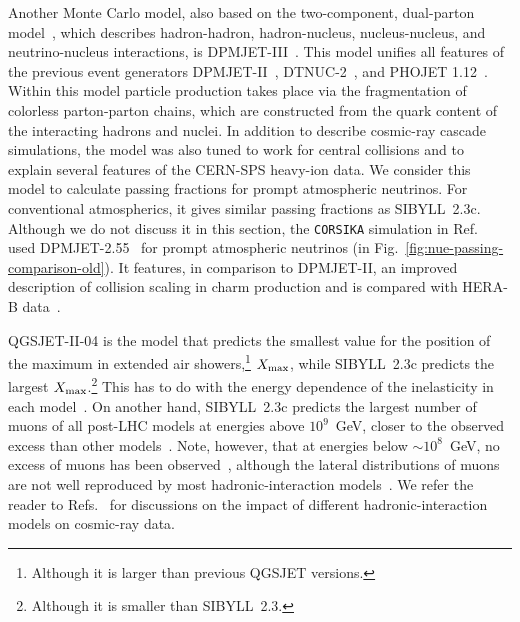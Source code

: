 \documentclass[aps,prd,showpacs,letterpaper,onecolumn,longbibliography,superscriptaddress,notitlepage,nofootinbib]{revtex4-1}%
\newcommand{\CORSIKA}{\texttt{CORSIKA}}
\begin{document}
Another Monte Carlo model, also based on the two-component, dual-parton model~\cite{Capella:1977me, Capella:1981xr, Capella:1992yb}, which describes hadron-hadron, hadron-nucleus, nucleus-nucleus, and neutrino-nucleus interactions, is DPMJET-III~\cite{Roesler:2000he}. This model unifies all features of the previous event generators DPMJET-II~\cite{Ranft:1994fd, Ranft:1999fy, Ranft:1999qe}, DTNUC-2~\cite{Engel:1996yb, Roesler:1998wy}, and PHOJET 1.12~\cite{Engel:1994vs, Engel:1995yda}. Within this model particle production takes place via the fragmentation of colorless parton-parton chains, which are constructed from the quark content of the interacting hadrons and nuclei. In addition to describe cosmic-ray cascade simulations, the model was also tuned to work for central collisions and to explain several features of the CERN-SPS heavy-ion data. We consider this model to calculate passing fractions for prompt atmospheric neutrinos. For conventional atmospherics, it gives similar passing fractions as SIBYLL~2.3c. Although we do not discuss it in this section, the \CORSIKA{} simulation in Ref.~\cite{Gaisser:2014bja} used DPMJET-2.55~\cite{Berghaus:2007hp} for prompt atmospheric neutrinos (in Fig.~\ref{fig:nue-passing-comparison-old}). It features, in comparison to DPMJET-II, an improved description of collision scaling in charm production and is compared with HERA-B data~\cite{Abt:2007zg}. 

QGSJET-II-04 is the model that predicts the smallest value for the position of the maximum in extended air showers,\footnote{Although it is larger than previous QGSJET versions.} $X_{\rm max}$, while SIBYLL~2.3c predicts the largest $X_{\rm max}$.\footnote{Although it is smaller than SIBYLL~2.3.} This has to do with the energy dependence of the inelasticity in each model~\cite{Ostapchenko:2016wtv}. On another hand, SIBYLL~2.3c predicts the largest number of muons of all post-LHC models at energies above $10^9$~GeV, closer to the observed excess than other models~\cite{Aab:2014pza, Apel:2017thr, Abbasi:2018fkz}. Note, however, that at energies below $\sim 10^8$~GeV, no excess of muons has been observed~\cite{Gonzalez:2016ntp, Fomin:2016kul}, although the lateral distributions of muons are not well reproduced by most hadronic-interaction models~\cite{Abbasi:2012kza}. We refer the reader to Refs.~\cite{Fedynitch:2012fs, Aab:2016hkv, Ostapchenko:2016wtv, Riehn:2017mfm, Dedenko:2017lag, Dedenko:2017hbu, Pierog:2018nkf} for discussions on the impact of different hadronic-interaction models on cosmic-ray data.
\end{document}
